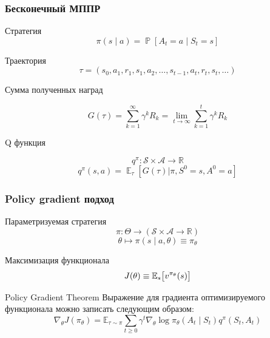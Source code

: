 \documentclass[notheorems]{beamer} %
\begin{document}
\begin{frame}
	\frametitle{Бесконечный МППР}
	\begin{block}{Стратегия}
	$$\pi ( s \mid a) = \mathop{\mathbb{P}}[A_t=a \mid S_t=s] $$
\end{block}
\begin{block}{Траектория}
	$$\tau = (s_0, a_1, r_1, s_1, a_2, \dots, s_{t-1}, a_{t}, r_{t}, s_t, \dots)$$
\end{block}

\begin{block}{Сумма полученных наград}
	
	$$G(\tau) =  \sum_{k=1}^{\infty}\gamma^kR_k = \lim_{t \to \infty} \sum_{k=1}^{t}\gamma^kR_k $$
\end{block}
	
	\begin{block}{Q функция}
		
		$$q^\pi: \mathcal{S} \times  \mathcal{A}  \to \mathbb{R}$$
		$$ q^\pi(s,a) = \mathop{\mathbb{E}}_{\tau}[G(\tau)|\pi,S^0=s,A^0=a] $$
	\end{block}
\end{frame}
\begin{frame}
	\frametitle{Policy gradient подход}
	
	\begin{block}{Параметризуемая стратегия}
		$$ \pi:\Theta \to (\mathcal{S} \times \mathcal{A} \to \mathbb{R}) $$
		$$ \theta \mapsto \pi ( s \mid a, \theta) \equiv \pi_\theta $$
	\end{block}

	\begin{block}{Максимизация функционала}
	$$ J(\theta) \equiv \mathbb{E}_s \big{[}v^{\pi_\theta}(s) \big{]} $$
\end{block}
\begin{block}{Policy Gradient Theorem} Выражение для градиента оптимизируемого функционала можно записать следующим образом:
	\begin{equation}\label{pgt_firstproof}
	\nabla_{\theta} J(\pi_\theta) = \mathbb{E}_{\tau \sim \pi} \sum_{t \ge 0} \gamma^t \nabla_{\theta} \log \pi_\theta (A_t \mid S_t) q^{\pi}(S_t, A_t)
	\end{equation}
\end{block}
\end{frame}
\end{document}
